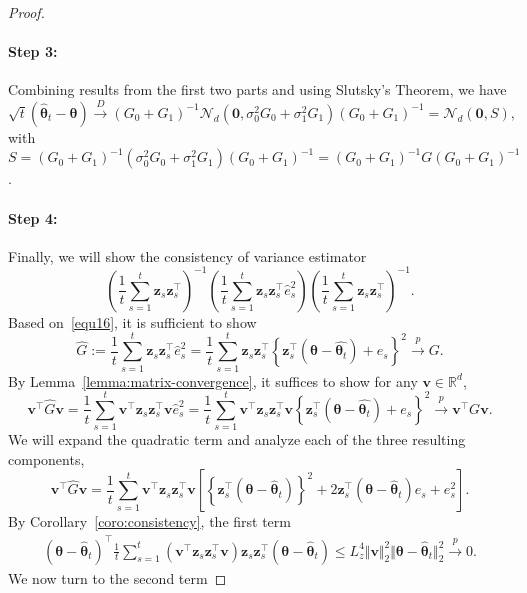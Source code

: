 \documentclass[12pt]{article}
\begin{document}
\begin{proof}
\paragraph{Step 3:} Combining results from the first two parts and using Slutsky's Theorem, we have
\[
\sqrt{t}(\widehat{\bm{\theta}}_{t} - \bm{\theta}) \stackrel{D}{\to}  (G_0+G_1)^{-1} \mathcal{N}_d(\bm{0},\sigma_0^2 G_0+\sigma_1^2G_1) (G_0+G_1)^{-1} = \mathcal{N}_d(\bm{0},S),
\]
with $S = \left(G_0+G_1\right)^{-1} \left(\sigma_0^2 G_0+\sigma_1^2G_1 \right)\left(G_0+G_1\right)^{-1}=\left(G_0+G_1\right)^{-1} G\left(G_0+G_1\right)^{-1}$.

\paragraph{Step 4:} Finally, we will show the consistency of variance estimator
\[
\left( \frac{1}{t} \sum_{s=1}^t \bm{z}_s \bm{z}_s^{\top} \right)^{-1} \left(\frac{1}{t}\sum_{s=1}^t \bm{z}_s \bm{z}_s^{\top} \widehat{e}_s^2 \right) \left( \frac{1}{t} \sum_{s=1}^t \bm{z}_s \bm{z}_s^{\top} \right)^{-1}.
\]
Based on~\eqref{equ16}, it is sufficient to show 
\[
\widehat{G} := \frac{1}{t} \sum_{s=1}^t \bm{z}_s \bm{z}_s^{\top} \widehat{e}_s^2 = \frac{1}{t} \sum_{s=1}^t \bm{z}_s \bm{z}_s^{\top} \left\{\bm{z}_s^\top(\bm{\theta}-\widehat{\bm{\theta}_t})+e_s \right\}^2
\stackrel{p}{\to} G.
\]
By Lemma~\ref{lemma:matrix-convergence}, it suffices to show for any $\bm{v} \in \mathbb{R}^d$,
\[
\bm{v}^\top \widehat{G}\bm{v} = \frac{1}{t} \sum_{s=1}^t \bm{v}^\top\bm{z}_s \bm{z}_s^{\top} \bm{v} \widehat{e}_s^2 = \frac{1}{t} \sum_{s=1}^t \bm{v}^\top \bm{z}_s \bm{z}_s^{\top} \bm{v}\left\{\bm{z}_s^\top(\bm{\theta}-\widehat{\bm{\theta}_t})+e_s \right\}^2
\stackrel{p}{\to} \bm{v}^\top G \bm{v}.
\]
We will expand the quadratic term and analyze each of the three resulting components,
\[
\bm{v}^\top \widehat{G}\bm{v}= \frac{1}{t} \sum_{s=1}^t \bm{v}^\top\bm{z}_s \bm{z}_s^{\top} \bm{v} \left[ \left\{\bm{z}_s^{\top}(\bm{\theta}-\widehat{\bm{\theta}}_{t}) \right\}^2 + 2\bm{z}_s^{\top}(\bm{\theta}-\widehat{\bm{\theta}}_{t})e_s+e_s^2 \right].
\]
By Corollary~\ref{coro:consistency}, the first term 
\begin{align*}
    (\bm{\theta}-\widehat{\bm{\theta}}_{t})^\top \frac{1}{t} \sum_{s=1}^t (\bm{v}^\top\bm{z}_s \bm{z}_s^{\top} \bm{v}) \bm{z}_s\bm{z}_s^\top (\bm{\theta}-\widehat{\bm{\theta}}_{t}) \le L_z^4 \Vert\bm{v} \Vert_2^2\Vert \bm{\theta} - \widehat{\bm{\theta}}_{t} \Vert_2^2 \stackrel{p}{\to}0.
\end{align*}
We now turn to the second term

\end{proof}
\end{document}
